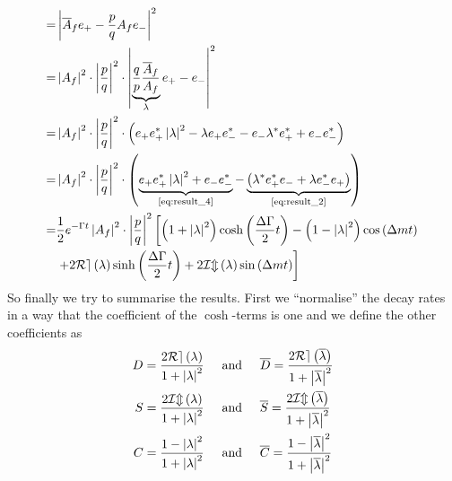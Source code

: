 \begin{align}
  =&\left|\overline{A}_f e_+ - \frac{p}{q} A_f e_-\right|^2\nonumber\\
  =&\left| A_f \right|^2 \cdot \left| \frac{p}{q} \right|^2 \cdot
  \left| \underbrace{\frac{q}{p}\frac{ \overline{A}_f }{ A_f }}_{\lambda} e_+ - e_-\right|^2\nonumber\\
  =& \left| A_f \right|^2 \cdot \left| \frac{p}{q} \right|^2\cdot\left( e_+e_+^*\left|\lambda\right|^2 -\lambda e_+e_-^*
  - e_-\lambda^*e_+^* + e_-e_-^*\right)\nonumber\\
  =& \left| A_f \right|^2 \cdot \left| \frac{p}{q} \right|^2\cdot\left(\underbrace{e_+e_+^*\left|\lambda\right|^2 + e_-e_-^*}_{\text{\cref{eq:result_4}}}
  -\underbrace{\left(\lambda^*e_+^*e_- + \lambda e_-^*e_+\right)}_{\text{\cref{eq:result_2}}}\right)\nonumber\\
  =&\frac{1}{2}e^{-\Gamma t}\left| A_f \right|^2 \cdot \left| \frac{p}{q} \right|^2\left[\left(1+\left|\lambda\right|^2\right)
  \cosh\left(\frac{\Delta\Gamma}{2}t\right)-\left(1-\left|\lambda\right|^2\right)\cos\left(\Delta mt\right)\right.\nonumber\\
  &\left.+2\mathcal{Re}\left(\lambda\right)\sinh\left(\frac{\Delta\Gamma}{2}t\right)
  +2\mathcal{Im}\left(\lambda\right)\sin\left(\Delta mt\right)\right]
\end{align}
So finally we try to summarise the results. First we \enquote{normalise} the decay rates in a way that the coefficient of the $\cosh$-terms is one and we
define the other coefficients as
\begin{align}
  D = \frac{2\mathcal{Re}\left(\lambda\right)}{1+\left|\lambda\right|^2} \hspace{0.5cm} &\text{and} \hspace{0.5cm}
  \overline{D} = \frac{2\mathcal{Re}\left(\overline{\lambda}\right)}{1+\left|\overline{\lambda}\right|^2}\nonumber\\
  S = \frac{2\mathcal{Im}\left(\lambda\right)}{1+\left|\lambda\right|^2} \hspace{0.5cm} &\text{and} \hspace{0.5cm}
  \overline{S} = \frac{2\mathcal{Im}\left(\overline{\lambda}\right)}{1+\left|\overline{\lambda}\right|^2}\nonumber\\
  C = \frac{1-\left|\lambda\right|^2}{1+\left|\lambda\right|^2} \hspace{0.5cm} &\text{and} \hspace{0.5cm}
  \overline{C} = \frac{1-\left|\overline{\lambda}\right|^2}{1+\left|\overline{\lambda}\right|^2}\nonumber
\end{align}
